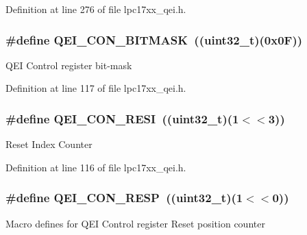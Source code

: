 \-Definition at line 276 of file lpc17xx\-\_\-qei.\-h.

\hypertarget{group___q_e_i___private___macros_gae25612fdeef077bd8154ace30b9b2091}{
\subsubsection[{\-Q\-E\-I\-\_\-\-C\-O\-N\-\_\-\-B\-I\-T\-M\-A\-S\-K}]{\setlength{\rightskip}{0pt plus 5cm}\#define {\bf \-Q\-E\-I\-\_\-\-C\-O\-N\-\_\-\-B\-I\-T\-M\-A\-S\-K}~((uint32\-\_\-t)(0x0\-F))}}\label{group___q_e_i___private___macros_gae25612fdeef077bd8154ace30b9b2091}
\-Q\-E\-I \-Control register bit-\/mask 

\-Definition at line 117 of file lpc17xx\-\_\-qei.\-h.

\hypertarget{group___q_e_i___private___macros_ga76aa5b26274777d9606d79c697511c61}{
\subsubsection[{\-Q\-E\-I\-\_\-\-C\-O\-N\-\_\-\-R\-E\-S\-I}]{\setlength{\rightskip}{0pt plus 5cm}\#define {\bf \-Q\-E\-I\-\_\-\-C\-O\-N\-\_\-\-R\-E\-S\-I}~((uint32\-\_\-t)(1$<$$<$3))}}\label{group___q_e_i___private___macros_ga76aa5b26274777d9606d79c697511c61}
\-Reset \-Index \-Counter 

\-Definition at line 116 of file lpc17xx\-\_\-qei.\-h.

\hypertarget{group___q_e_i___private___macros_gadab2ce38aa6d4b60258d5db13982e55c}{
\subsubsection[{\-Q\-E\-I\-\_\-\-C\-O\-N\-\_\-\-R\-E\-S\-P}]{\setlength{\rightskip}{0pt plus 5cm}\#define {\bf \-Q\-E\-I\-\_\-\-C\-O\-N\-\_\-\-R\-E\-S\-P}~((uint32\-\_\-t)(1$<$$<$0))}}\label{group___q_e_i___private___macros_gadab2ce38aa6d4b60258d5db13982e55c}
\-Macro defines for \-Q\-E\-I \-Control register \-Reset position counter 

